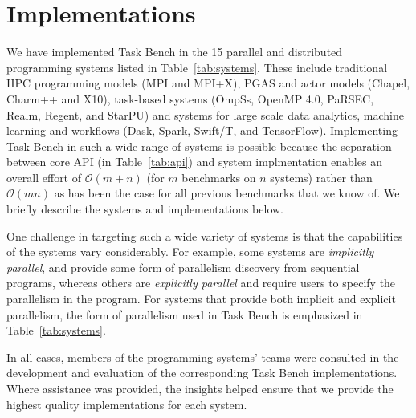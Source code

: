 \section{Implementations}
\label{sec:implementation}

We have implemented Task Bench in the 15 parallel and distributed
programming systems listed in Table~\ref{tab:systems}. These include
traditional HPC programming models (MPI and MPI+X), PGAS and actor
models (Chapel, Charm++ and X10), task-based systems (OmpSs, OpenMP
4.0, PaRSEC, Realm, Regent, and StarPU) and systems for large scale
data analytics, machine learning and workflows (Dask, Spark, Swift/T,
and TensorFlow). Implementing Task Bench in such a wide range of
systems is possible because the separation between core API (in
Table~\ref{tab:api}) and system implmentation enables an overall
effort of $\mathcal{O}(m + n)$ (for $m$ benchmarks on $n$ systems)
rather than $\mathcal{O}(mn)$ as has been the case for all previous
benchmarks that we know of. We briefly describe the systems and
implementations below.

One challenge in targeting such a wide variety of
systems is that the capabilities of the systems vary considerably. For
example, some systems are \emph{implicitly parallel}, and provide some
form of parallelism discovery from sequential programs, whereas others
are \emph{explicitly parallel} and require users to specify the
parallelism in the program. For systems that provide both implicit and explicit parallelism, the form of parallelism used in Task Bench is emphasized in Table~\ref{tab:systems}.



In all cases, members of the programming systems' teams
were consulted in the development and evaluation of the
corresponding Task Bench implementations. Where assistance was provided, the insights helped ensure that we provide the highest quality implementations for each system.

